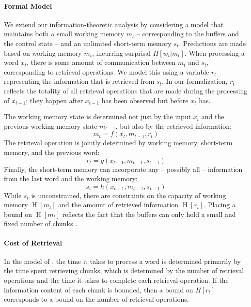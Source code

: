 \documentclass[11pt,letterpaper]{article}
\begin{document}
\paragraph{Formal Model}
We extend our information-theoretic analysis by considering a model that maintains both a small working memory $m_t$ -- corresponding to the buffers and the control state -- and an unlimited short-term memory $s_t$.
Predictions are made based on working memory $m_t$, incurring surprisal $H[w_t|m_t]$.
When processing a word $x_t$, there is some amount of communication between $m_t$ and $s_t$, corresponding to retrieval operations.
We model this using a variable $r_t$ representing the information that is retrieved from $s_t$.
In our formalization, $r_t$ reflects the totality of all retrieval operations that are made during the processing of $x_{t-1}$; they happen after $x_{t-1}$ has been observed but before $x_t$ has.

The working memory state is determined not just by the input $x_t$ and the previous working memory state $m_{t-1}$, but also by the retrieved information:
\begin{equation}
	m_t = f(x_t, m_{t-1}, r_t) 
\end{equation}
The retrieval operation is jointly determined by working memory, short-term memory, and the previous word:
\begin{equation}\label{eq:rt}
	r_t = g(x_{t-1}, m_{t-1}, s_{t-1}) 
\end{equation}
Finally, the short-term memory can incorporate any -- possibly all -- information from the last word and the working memory:
\begin{equation}
	s_t = h(x_{t-1}, m_{t-1}, s_{t-1}) 
\end{equation}
While $s_t$ is unconstrained, there are constraints on the capacity of working memory $\operatorname{H}[m_t]$ and the amount of retrieved information $\operatorname{H}[r_t]$.
Placing a bound on $\operatorname{H}[m_t]$ reflects the fact that the buffers can only hold a small and fixed number of chunks \citep{lewis-activation-based-2005}.


\paragraph{Cost of Retrieval}
In the model of \cite{lewis-activation-based-2005}, the time it takes to process a word is determined primarily by the time spent retrieving chunks, which is determined by the number of retrieval operations and the time it takes to complete each retrieval operation.
If the information content of each chunk is bounded, then a bound on $H[r_t]$ corresponds to a bound on the number of retrieval operations.
\end{document}
